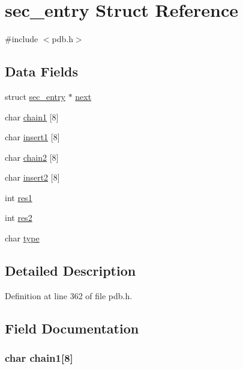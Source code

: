 \hypertarget{structsec__entry}{\section{sec\-\_\-entry Struct Reference}
\label{structsec__entry}
}


{\ttfamily \#include $<$pdb.\-h$>$}

\subsection*{Data Fields}
\begin{DoxyCompactItemize}
\item 
struct \hyperlink{structsec__entry}{sec\-\_\-entry} $\ast$ \hyperlink{structsec__entry_a4d3b6eefdc705fac914bf5542b4392e9}{next}
\item 
char \hyperlink{structsec__entry_a8cedbe7b30d9930ce6574f146e6ca7d7}{chain1} \mbox{[}8\mbox{]}
\item 
char \hyperlink{structsec__entry_a40813cb2e390608ac9828d857950ffd1}{insert1} \mbox{[}8\mbox{]}
\item 
char \hyperlink{structsec__entry_a0b12586562770f31367fa9a7af4a1b09}{chain2} \mbox{[}8\mbox{]}
\item 
char \hyperlink{structsec__entry_aa36703384eb0aaa384cc934ddfee1882}{insert2} \mbox{[}8\mbox{]}
\item 
int \hyperlink{structsec__entry_ab0c79f65dfbf2f2f2d7e108f73fe6f18}{res1}
\item 
int \hyperlink{structsec__entry_ab2a9ff6fb3a64621cb23e1eb1290e043}{res2}
\item 
char \hyperlink{structsec__entry_aff17911edc8208aa8ddb1c7c52c78389}{type}
\end{DoxyCompactItemize}


\subsection{Detailed Description}


Definition at line 362 of file pdb.\-h.



\subsection{Field Documentation}
\hypertarget{structsec__entry_a8cedbe7b30d9930ce6574f146e6ca7d7}{
\subsubsection[{chain1}]{\setlength{\rightskip}{0pt plus 5cm}char chain1\mbox{[}8\mbox{]}}}\label{structsec__entry_a8cedbe7b30d9930ce6574f146e6ca7d7}



